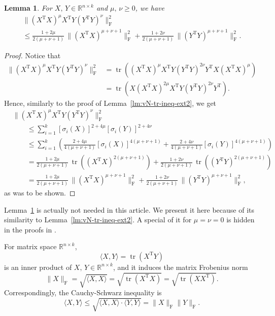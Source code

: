 \documentclass[11pt]{article}
\def\bbR{\mathbb{R}}
\DeclareMathOperator{\tr}{tr}
\DeclareMathOperator{\F}{F}
\DeclareMathOperator{\T}{T}
\newtheorem{lemma}{Lemma}[section]
\theoremstyle{definition}
\numberwithin{equation}{section}
\begin{document}
\begin{lemma}\label{lm:vN-tr-ineq-ext3}
For $X,\,Y\in\bbR^{n\times k}$ and $\mu,\,\nu\ge 0$,  we have
\begin{multline*}
\|(X^{\T}X)^{\mu}X^{\T}Y(Y^{\T}Y)^{\nu}\|_{\F}^2 \\
   \le\frac {1+2\mu}{2(\mu+\nu+1)}\,\|(X^{\T}X)^{\mu+\nu+1}\|_{\F}^2+\frac {1+2\nu}{2(\mu+\nu+1)}\,\|(Y^{\T}Y)^{\mu+\nu+1}\|_{\F}^2.
\end{multline*}
\end{lemma}

\begin{proof}
Notice that
\begin{align*}
\|(X^{\T}X)^{\mu}X^{\T}Y(Y^{\T}Y)^{\nu}\|_{\F}^2
   &=\tr((X^{\T}X)^{\mu}X^{\T}Y(Y^{\T}Y)^{2\nu}Y^{\T}X(X^{\T}X)^{\mu}) \\
   &=\tr(X(X^{\T}X)^{2\mu}X^{\T}Y(Y^{\T}Y)^{2\nu}Y^{\T}).
\end{align*}
Hence, similarly to the proof of Lemma~\ref{lm:vN-tr-ineq-ext2}, we get
\begin{align*}
&\|(X^{\T}X)^{\mu}X^{\T}Y(Y^{\T}Y)^{\nu}\|_{\F}^2 \\
  &\qquad\le \sum_{i=1}^k[\sigma_i(X)]^{2+4\mu}[\sigma_i(Y)]^{2+4\nu} \\
  &\qquad\le \sum_{i=1}^k\left(\frac {2+4\mu}{4(\mu+\nu+1)}[\sigma_i(X)]^{4(\mu+\nu+1)}
                +\frac {2+4\nu}{4(\mu+\nu+1)}[\sigma_i(Y)]^{4(\mu+\nu+1)}\right)        \\
  &\qquad=\frac {1+2\mu}{2(\mu+\nu+1)}\,\tr((X^{\T}X)^{2(\mu+\nu+1)})+\frac {1+2\nu}{2(\mu+\nu+1)}\,\tr((Y^{\T}Y)^{2(\mu+\nu+1)}) \\
  &\qquad=\frac {1+2\mu}{2(\mu+\nu+1)}\,\|(X^{\T}X)^{\mu+\nu+1}\|_{\F}^2+\frac {1+2\nu}{2(\mu+\nu+1)}\,\|(Y^{\T}Y)^{\mu+\nu+1}\|_{\F}^2,
\end{align*}
as was to be shown.
\end{proof}

Lemma~\ref{lm:vN-tr-ineq-ext3} is actually not needed in this article. We present it here because of its similarity to Lemma~\ref{lm:vN-tr-ineq-ext2}.
A special of it for $\mu=\nu=0$ is hidden in the proofs in \cite{zhzl:2017}.

\iffalse
For matrix space $\bbR^{n\times k}$,
$$
\langle X,Y\rangle=\tr(X^{\T}Y)
$$
is an inner product of $X,\,Y\in\bbR^{n\times k}$, and it induces the matrix Frobenius norm
$$
\|X\|_{\F}=\sqrt{\langle X,X\rangle}=\sqrt{\tr(X^{\T}X)}=\sqrt{\tr(XX^{\T})}.
$$
Correspondingly, the Cauchy-Schwarz inequality is
$$
\langle X,Y\rangle\le\sqrt{\langle X,X\rangle\cdot\langle Y,Y\rangle}
     =\|X\|_{\F}\|Y\|_{\F}.
$$
\end{document}
